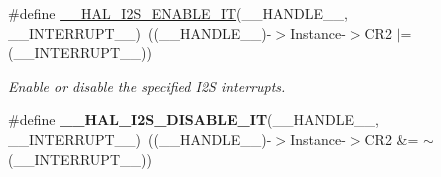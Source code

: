 \begin{DoxyCompactItemize}
\item 
\#define \hyperlink{group___i2_s___exported___macros_gad6f90125be5ad17065e5378c7580708a}{\+\_\+\+\_\+\+H\+A\+L\+\_\+\+I2\+S\+\_\+\+E\+N\+A\+B\+L\+E\+\_\+\+IT}(\+\_\+\+\_\+\+H\+A\+N\+D\+L\+E\+\_\+\+\_\+,  \+\_\+\+\_\+\+I\+N\+T\+E\+R\+R\+U\+P\+T\+\_\+\+\_\+)~((\+\_\+\+\_\+\+H\+A\+N\+D\+L\+E\+\_\+\+\_\+)-\/$>$Instance-\/$>$C\+R2 $\vert$= (\+\_\+\+\_\+\+I\+N\+T\+E\+R\+R\+U\+P\+T\+\_\+\+\_\+))
\begin{DoxyCompactList}\small\item\em Enable or disable the specified I2S interrupts. \end{DoxyCompactList}\item 
\#define {\bfseries \+\_\+\+\_\+\+H\+A\+L\+\_\+\+I2\+S\+\_\+\+D\+I\+S\+A\+B\+L\+E\+\_\+\+IT}(\+\_\+\+\_\+\+H\+A\+N\+D\+L\+E\+\_\+\+\_\+,  \+\_\+\+\_\+\+I\+N\+T\+E\+R\+R\+U\+P\+T\+\_\+\+\_\+)~((\+\_\+\+\_\+\+H\+A\+N\+D\+L\+E\+\_\+\+\_\+)-\/$>$Instance-\/$>$C\+R2 \&= $\sim$(\+\_\+\+\_\+\+I\+N\+T\+E\+R\+R\+U\+P\+T\+\_\+\+\_\+))\hypertarget{group___i2_s___exported___macros_gaa78db4341e43a5fb30c815b22137a9e7}{}\label{group___i2_s___exported___macros_gaa78db4341e43a5fb30c815b22137a9e7}


\end{DoxyCompactItemize}

